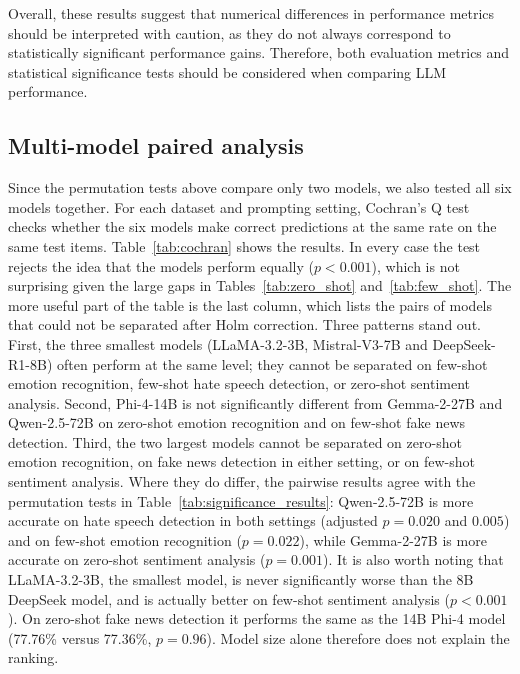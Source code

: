 \documentclass[10pt,letterpaper]{article}
\begin{document}
Overall, these results suggest that numerical differences in performance metrics should be interpreted with caution, as they do not always correspond to statistically significant performance gains. Therefore, both evaluation metrics and statistical significance tests should be considered when comparing LLM performance.

\subsection*{Multi-model paired analysis}

Since the permutation tests above compare only two models, we also tested all six models together. For each dataset and prompting setting, Cochran's Q test checks whether the six models make correct predictions at the same rate on the same test items. Table~\ref{tab:cochran} shows the results. In every case the test rejects the idea that the models perform equally ($p < 0.001$), which is not surprising given the large gaps in Tables~\ref{tab:zero_shot} and~\ref{tab:few_shot}. The more useful part of the table is the last column, which lists the pairs of models that could not be separated after Holm correction. Three patterns stand out. First, the three smallest models (LLaMA-3.2-3B, Mistral-V3-7B and DeepSeek-R1-8B) often perform at the same level; they cannot be separated on few-shot emotion recognition, few-shot hate speech detection, or zero-shot sentiment analysis. Second, Phi-4-14B is not significantly different from Gemma-2-27B and Qwen-2.5-72B on zero-shot emotion recognition and on few-shot fake news detection. Third, the two largest models cannot be separated on zero-shot emotion recognition, on fake news detection in either setting, or on few-shot sentiment analysis. Where they do differ, the pairwise results agree with the permutation tests in Table~\ref{tab:significance_results}: Qwen-2.5-72B is more accurate on hate speech detection in both settings (adjusted $p = 0.020$ and $0.005$) and on few-shot emotion recognition ($p = 0.022$), while Gemma-2-27B is more accurate on zero-shot sentiment analysis ($p = 0.001$). It is also worth noting that LLaMA-3.2-3B, the smallest model, is never significantly worse than the 8B DeepSeek model, and is actually better on few-shot sentiment analysis ($p < 0.001$). On zero-shot fake news detection it performs the same as the 14B Phi-4 model (77.76\% versus 77.36\%, $p = 0.96$). Model size alone therefore does not explain the ranking.
\end{document}
